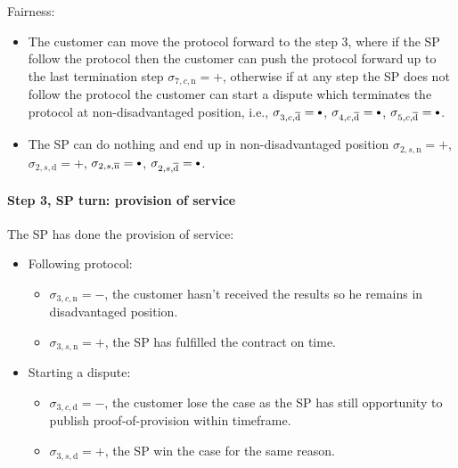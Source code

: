 \documentclass{ieeeaccess}
\newcommand\sbullet[1][.75]{\mathbin{\ThisStyle{\vcenter{\hbox{%
  \scalebox{#1}{$\SavedStyle\bullet$}}}}}%
}
\begin{document}
Fairness:

\begin{itemize}

\item
  The customer can move the protocol forward to the step 3, where if the
  SP follow the protocol then the customer can push the protocol forward
  up to the last termination step \(\sigma_{7, c, \mathrm{n}} = +\),
  otherwise if at any step the SP does not follow the protocol the
  customer can start a dispute which terminates the protocol at
  non-disadvantaged position, i.e.,
  \(\sigma_{3, c, \overline{\mathrm{d}}} = \sbullet\),
  \(\sigma_{4, c, \overline{\mathrm{d}}} = \sbullet\),
  \(\sigma_{5, c, \overline{\mathrm{d}}} = \sbullet\).
\item
  The SP can do nothing and end up in non-disadvantaged position
  \(\sigma_{2, s, \mathrm{n}} = +\), \(\sigma_{2, s, \mathrm{d}} = +\),
  \(\sigma_{2, s, \overline{\mathrm{n}}} = \sbullet\),
  \(\sigma_{2, s, \overline{\mathrm{d}}} = \sbullet\).
\end{itemize}

\paragraph{Step 3, SP turn: provision of service}\label{step-3-provision-of-service}

The SP has done the provision of service:

\begin{itemize}
\item
  Following protocol:

  \begin{itemize}
  
  \item
    \(\sigma_{3, c, \mathrm{n}} = -\), the customer hasn't received the
    results so he remains in disadvantaged position.
  \item
    \(\sigma_{3, s, \mathrm{n}} = +\), the SP has fulfilled the contract
    on time.
  \end{itemize}
\item
  Starting a dispute:

  \begin{itemize}
  
  \item
    \(\sigma_{3, c, \mathrm{d}} = -\), the customer lose the case as the
    SP has still opportunity to publish proof-of-provision within
    timeframe.
  \item
    \(\sigma_{3, s, \mathrm{d}} = +\), the SP win the case for the same
    reason.
  \end{itemize}
\end{itemize}
\end{document}
